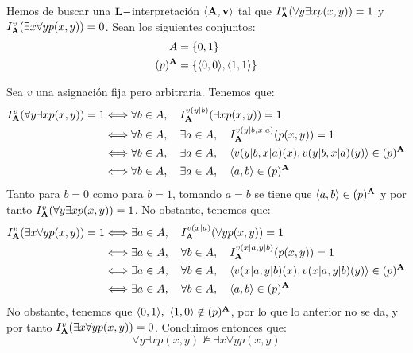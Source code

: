 \begin{ejercicio}
\begin{enumerate}
        Hemos de buscar una $\bf{L}-$interpretación $\langle \bf{A},v\rangle$ tal que $I_{\bf{A}}^v(\forall y\exists x p(x,y))=1$ y $I_{\bf{A}}^v(\exists x\forall y p(x,y))=0$.
        Sean los siguientes conjuntos:
        \begin{align*}
            A&=\{0,1\}\\
            (p)^{\bf{A}}&=\{\langle 0,0\rangle,\langle 1,1\rangle\}
        \end{align*}

        Sea $v$ una asignación fija pero arbitraria. Tenemos que:
        \begin{align*}
            I_{\bf{A}}^v(\forall y\exists x p(x,y)) = 1
            & \Longleftrightarrow \forall b\in A,\quad  I_{\bf{A}}^{v(y|b)}(\exists x p(x,y))=1\\
            & \Longleftrightarrow \forall b\in A,\quad  \exists a\in A,\quad I_{\bf{A}}^{v(y|b,x|a)}(p(x,y))=1\\
            & \Longleftrightarrow \forall b\in A,\quad  \exists a\in A,\quad \langle v(y|b,x|a)(x),v(y|b,x|a)(y)\rangle\in (p)^{\bf{A}}\\
            & \Longleftrightarrow \forall b\in A,\quad  \exists a\in A,\quad \langle a,b\rangle\in (p)^{\bf{A}}
        \end{align*}
        Tanto para $b=0$ como para $b=1$, tomando $a=b$ se tiene que $\langle a,b\rangle\in (p)^{\bf{A}}$ y por tanto $I_{\bf{A}}^v(\forall y\exists x p(x,y))=1$. No obstante, tenemos que:
        \begin{align*}
            I_{\bf{A}}^v(\exists x\forall y p(x,y)) = 1
            & \Longleftrightarrow \exists a\in A,\quad  I_{\bf{A}}^{v(x|a)}(\forall y p(x,y))=1\\
            & \Longleftrightarrow \exists a\in A,\quad  \forall b\in A,\quad I_{\bf{A}}^{v(x|a,y|b)}(p(x,y))=1\\
            & \Longleftrightarrow \exists a\in A,\quad  \forall b\in A,\quad \langle v(x|a,y|b)(x),v(x|a,y|b)(y)\rangle\in (p)^{\bf{A}}\\
            & \Longleftrightarrow \exists a\in A,\quad  \forall b\in A,\quad \langle a,b\rangle\in (p)^{\bf{A}}
        \end{align*}
        No obstante, tenemos que $\langle 0,1\rangle,~\langle 1,0\rangle\notin (p)^{\bf{A}}$,
        por lo que lo anterior no se da, y por tanto $I_{\bf{A}}^v(\exists x\forall y p(x,y))=0$.
        Concluimos entonces que:
        \[\forall y\exists x p(x,y)\nvDash \exists x\forall y p(x,y)\]


\end{enumerate}
\end{ejercicio}
